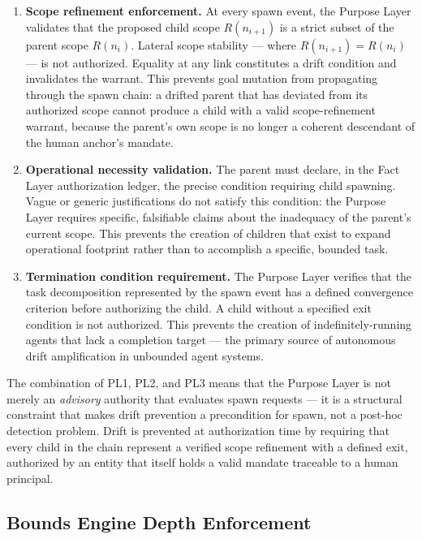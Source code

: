 \begin{enumerate}
    \item[(PL1)]\textbf{Scope refinement enforcement.} At every spawn event, the Purpose Layer validates that the proposed child scope $R(n_{i+1})$ is a strict subset of the parent scope $R(n_i)$. Lateral scope stability — where $R(n_{i+1}) = R(n_i)$ — is not authorized. Equality at any link constitutes a drift condition and invalidates the warrant. This prevents goal mutation from propagating through the spawn chain: a drifted parent that has deviated from its authorized scope cannot produce a child with a valid scope-refinement warrant, because the parent's own scope is no longer a coherent descendant of the human anchor's mandate.

    \item[(PL2)]\textbf{Operational necessity validation.} The parent must declare, in the Fact Layer authorization ledger, the precise condition requiring child spawning. Vague or generic justifications do not satisfy this condition: the Purpose Layer requires specific, falsifiable claims about the inadequacy of the parent's current scope. This prevents the creation of children that exist to expand operational footprint rather than to accomplish a specific, bounded task.

    \item[(PL3)]\textbf{Termination condition requirement.} The Purpose Layer verifies that the task decomposition represented by the spawn event has a defined convergence criterion before authorizing the child. A child without a specified exit condition is not authorized. This prevents the creation of indefinitely-running agents that lack a completion target — the primary source of autonomous drift amplification in unbounded agent systems.
\end{enumerate}

The combination of PL1, PL2, and PL3 means that the Purpose Layer is not merely an \emph{advisory} authority that evaluates spawn requests — it is a structural constraint that makes drift prevention a precondition for spawn, not a post-hoc detection problem. Drift is prevented at authorization time by requiring that every child in the chain represent a verified scope refinement with a defined exit, authorized by an entity that itself holds a valid mandate traceable to a human principal.

\subsection{Bounds Engine Depth Enforcement}
\label{sec:rs-bounds-engine-depth}

